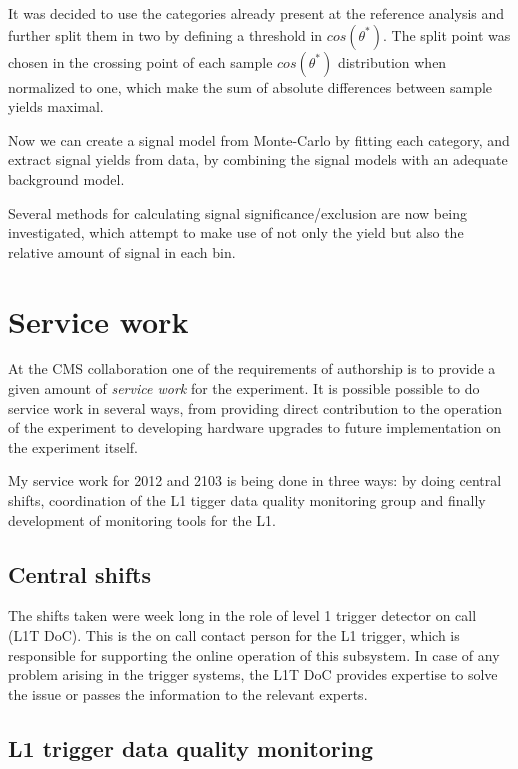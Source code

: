 \documentclass[%
reprint,
amsmath,
amssymb,
aps,
pra,
showkeys
]{revtex4-1}
\begin{document}
It was decided to use the categories already present at the reference analysis and further split them in two by 
defining a threshold in $cos(\theta^{*})$. The split point was chosen in the crossing point of each sample 
$cos(\theta^{*})$ distribution when normalized to one, which make the sum of absolute differences between sample 
yields maximal.

Now we can create a signal model from Monte-Carlo by fitting each category, and extract signal yields from data, 
by combining the signal models with an adequate background model.

Several methods for calculating signal significance/exclusion are now being investigated, which attempt to make use 
of not only the yield but also the relative amount of signal in each bin.

\section{Service work}

At the CMS collaboration one of the requirements of authorship is to provide a given amount of \textit{service work}
for the experiment.
It is possible possible to do service work in several ways, from providing direct contribution to the operation of
the experiment to developing hardware upgrades to future implementation on the experiment itself.

My service work for 2012 and 2103 is being done in three ways: by doing central shifts, coordination of the L1 tigger
data quality monitoring group and finally development of monitoring tools for the L1.

\subsection{Central shifts}

The shifts taken were week long in the role of level 1 trigger detector on call (L1T DoC). This is the on call contact
person for the L1 trigger, which is responsible for supporting the online operation of this subsystem. In case of
any problem arising in the trigger systems, the L1T DoC provides expertise to solve the issue or passes the information
to the relevant experts.

\subsection{L1 trigger data quality monitoring}
\end{document}
